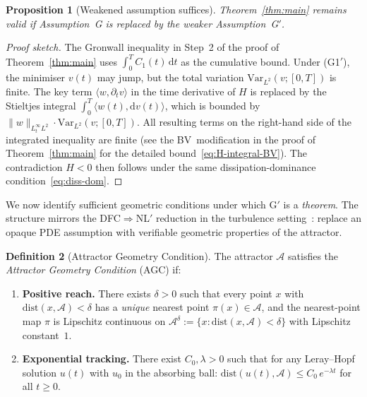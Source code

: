 \documentclass[12pt,a4paper]{article}
\theoremstyle{definition}
\newtheorem{definition}{Definition}[section]
\theoremstyle{plain}
\newtheorem{proposition}[definition]{Proposition}
\theoremstyle{remark}
\begin{document}
\begin{proposition}[Weakened assumption suffices]\label{prop:Gprime}
Theorem~\ref{thm:main} remains valid if Assumption~G is replaced by the
weaker Assumption~G$'$.
\end{proposition}

\begin{proof}[Proof sketch]
The Gronwall inequality in Step~2 of the proof of
Theorem~\ref{thm:main} uses $\int_0^T C_1(t)\,\mathrm{d} t$ as the cumulative
bound. Under (G1$'$), the minimiser $v(t)$ may jump, but the total
variation $\mathrm{Var}_{L^2}(v;[0,T])$ is finite. The key term
$\langle w, \partial_t v \rangle$ in the time derivative of $H$ is
replaced by the Stieltjes integral $\int_0^T \langle w(t),
\mathrm{d} v(t)\rangle$, which is bounded by $\|w\|_{L^\infty_t L^2}\cdot
\mathrm{Var}_{L^2}(v;[0,T])$. All resulting terms on the right-hand
side of the integrated inequality are finite (see the BV~modification
in the proof of Theorem~\ref{thm:main} for the detailed
bound~\eqref{eq:H-integral-BV}). The contradiction $H < 0$ then
follows under the same dissipation-dominance
condition~\eqref{eq:diss-dom}.
\end{proof}

We now identify sufficient geometric conditions under which G$'$ is a
\emph{theorem}. The structure mirrors the DFC$\Rightarrow$NL$'$
reduction in the turbulence setting~\cite{FST-TU2026}: replace an
opaque PDE assumption with verifiable geometric properties of the
attractor.

\begin{definition}[Attractor Geometry Condition]\label{def:AGC}
The attractor $\mathcal{A}$ satisfies the \emph{Attractor Geometry
Condition} (AGC) if:
\begin{enumerate}
  \item[\textup{(AGC1)}] \textbf{Positive reach.}\;
    There exists $\delta > 0$ such that every point $x$ with
    $\mathrm{dist}(x, \mathcal{A}) < \delta$ has a \emph{unique}
    nearest point $\pi(x) \in \mathcal{A}$, and the nearest-point map
    $\pi$ is Lipschitz continuous on
    $\mathcal{A}^\delta := \{x : \mathrm{dist}(x,\mathcal{A}) < \delta\}$
    with Lipschitz constant~$1$.
  \item[\textup{(AGC2)}] \textbf{Exponential tracking.}\;
    There exist $C_0, \lambda > 0$ such that for any Leray--Hopf solution
    $u(t)$ with $u_0$ in the absorbing ball:
    $\mathrm{dist}(u(t), \mathcal{A}) \le C_0\,e^{-\lambda t}$ for all
    $t \ge 0$.
\end{enumerate}
\end{definition}
\end{document}
